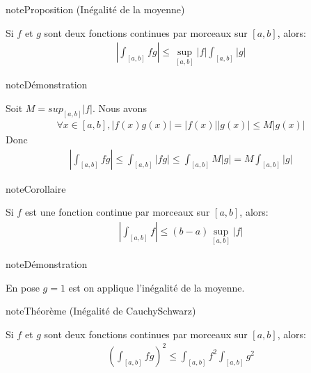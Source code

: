 \documentclass[letterpaper,10pt,french]{jupyterBook}
\begin{document}
\begin{sphinxadmonition}{note}{Proposition (Inégalité de la moyenne)}

\sphinxAtStartPar
Si \(f\) et \(g\) sont deux fonctions continues par morceaux sur \([a, b]\), alors:
\begin{equation*}
\begin{split}
\left |\int_{[a, b]}fg \right | \leq \sup_{[a, b]} |f| \int_{[a, b]}|g|
\end{split}
\end{equation*}\end{sphinxadmonition}

\begin{sphinxadmonition}{note}{Démonstration}

\sphinxAtStartPar
Soit \(M = sup_{[a,b]}|f|\).
Nous avons
\begin{equation*}
\begin{split}
\forall x \in [a, b], |f(x)g(x)|=|f(x)||g(x)| \leq M |g(x)|
\end{split}
\end{equation*}
\sphinxAtStartPar
Donc
\begin{equation*}
\begin{split}
\left |\int_{[a, b]}fg \right | \leq \int_{[a, b]}|fg| \leq \int_{[a, b]}M|g| =M\int_{[a, b]}|g|
\end{split}
\end{equation*}\end{sphinxadmonition}

\begin{sphinxadmonition}{note}{Corollaire}

\sphinxAtStartPar
Si \(f\) est une fonction continue par morceaux sur \([a, b]\), alors:
\begin{equation*}
\begin{split}
\left |\int_{[a, b]}f \right | \leq (b-a)  \sup_{[a, b]}|f|
\end{split}
\end{equation*}\end{sphinxadmonition}

\begin{sphinxadmonition}{note}{Démonstration}

\sphinxAtStartPar
En pose \(g=1\) est on applique l’inégalité de la moyenne.
\end{sphinxadmonition}

\begin{sphinxadmonition}{note}{Théorème (Inégalité de Cauchy\sphinxhyphen{}Schwarz)}

\sphinxAtStartPar
Si \(f\) et \(g\) sont deux fonctions continues par morceaux sur \([a, b]\), alors:
\begin{equation*}
\begin{split}
\left (\int_{[a, b]}fg \right ) ^2 \leq \int_{[a, b]} f^2 \int_{[a, b]}g^2
\end{split}
\end{equation*}\end{sphinxadmonition}
\end{document}
